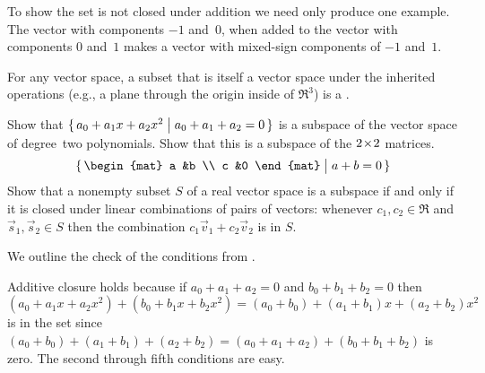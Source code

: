 \begin{exercises}
\begin{answer}
     To show the set is not closed under addition we need only produce one
     example.  
     The vector with components $-1$ and~$0$, when added to the vector
     with components $0$ and~$1$ makes a vector with mixed-sign components
     of $-1$ and~$1$.
   \end{answer}
  \item 
    For any vector space, a subset that is itself a vector space
    under the inherited operations
    (e.g., a plane through the origin inside of \( \Re^3 \))
    is a .
    \begin{exparts}
      \partsitem Show that \( \mbox{$\{\,a_0+a_1x+a_2x^2\bigm| a_0+a_1+a_2=0\,\}$} \)
        is a subspace of the vector space of degree~two polynomials.
      \partsitem Show that this is a subspace of the \( 2 \! \times \! 2 \) matrices.
        \begin{equation*}
          \set{\begin{mat}
                 a  &b  \\
                 c  &0
               \end{mat} \suchthat a+b=0}
        \end{equation*}
      \partsitem Show that a nonempty subset \( S \) of a real vector
        space is a
        subspace if and only if it is closed under linear combinations of
        pairs of vectors: whenever \( c_1,c_2\in\Re \) and
        \( \vec{s}_1,\vec{s}_2\in S \) then the combination
        \( c_1\vec{v}_1+c_2\vec{v}_2 \) is in \( S \).
    \end{exparts}
    \begin{answer}
      \begin{exparts}
        \partsitem We outline the check of the conditions from
          .

          Additive closure holds because if \( a_0+a_1+a_2=0 \)
          and \( b_0+b_1+b_2=0 \) then
          \begin{equation*}
            (a_0+a_1x+a_2x^2)+(b_0+b_1x+b_2x^2)=
            (a_0+b_0)+(a_1+b_1)x+(a_2+b_2)x^2
          \end{equation*}
          is in the set since
          \( (a_0+b_0)+(a_1+b_1)+(a_2+b_2)=(a_0+a_1+a_2)+(b_0+b_1+b_2) \)
          is zero.
          The second through fifth conditions are easy.


\end{exparts}
\end{answer}
\end{exercises}
